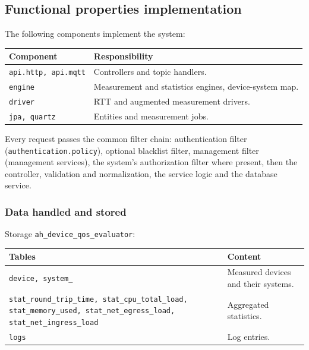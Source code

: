 \documentclass[a4paper]{arrowhead}
\begin{document}
\subsection{Functional properties implementation}

The following components implement the system:

\noindent\begin{longtable}{| p{5.6cm} | p{9.6cm} |} \hline
\rowcolor{gray!33} Component & Responsibility \\ \hline \endhead
\texttt{api.\allowbreak{}http,\allowbreak{} api.\allowbreak{}mqtt} & Controllers and topic handlers. \\ \hline
\texttt{engine} & Measurement and statistics engines, device-system map. \\ \hline
\texttt{driver} & RTT and augmented measurement drivers. \\ \hline
\texttt{jpa,\allowbreak{} quartz} & Entities and measurement jobs. \\ \hline
\end{longtable}

Every request passes the common filter chain: authentication filter (\texttt{authentication.\allowbreak{}policy}), optional blacklist filter, management filter (management services), the system's authorization filter where present, then the controller, validation and normalization, the service logic and the database service.

\subsubsection{Data handled and stored}

Storage \texttt{ah\_\allowbreak{}device\_\allowbreak{}qos\_\allowbreak{}evaluator}:

\noindent\begin{longtable}{| p{6.4cm} | p{8.8cm} |} \hline
\rowcolor{gray!33} Tables & Content \\ \hline \endhead
\texttt{device,\allowbreak{} system\_\allowbreak{}} & Measured devices and their systems. \\ \hline
\texttt{stat\_\allowbreak{}round\_\allowbreak{}trip\_\allowbreak{}time,\allowbreak{} stat\_\allowbreak{}cpu\_\allowbreak{}total\_\allowbreak{}load,\allowbreak{} stat\_\allowbreak{}memory\_\allowbreak{}used,\allowbreak{} stat\_\allowbreak{}net\_\allowbreak{}egress\_\allowbreak{}load,\allowbreak{} stat\_\allowbreak{}net\_\allowbreak{}ingress\_\allowbreak{}load} & Aggregated statistics. \\ \hline
\texttt{logs} & Log entries. \\ \hline
\end{longtable}
\end{document}
